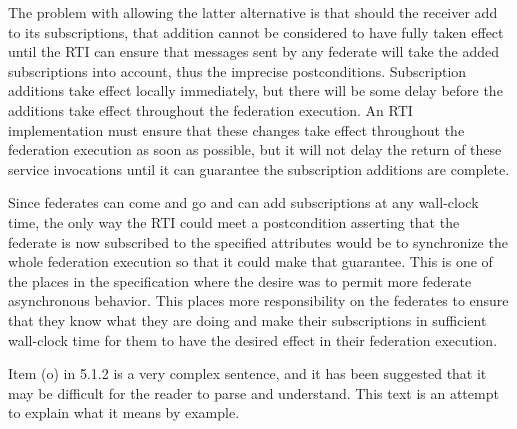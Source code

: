 \begin{annexstdpage}
    The problem with allowing the latter alternative is that should the receiver add to its subscriptions, that addition cannot be considered to have fully taken effect until the RTI can ensure that messages sent by any federate will take the added subscriptions into account, thus the imprecise postconditions. Subscription additions take effect locally immediately, but there will be some delay before the additions take effect throughout the federation execution. An RTI implementation must ensure that these changes take effect throughout the federation execution as soon as possible, but it will not delay the return of these service invocations until it can guarantee the subscription additions are complete.

    Since federates can come and go and can add subscriptions at any wall-clock time, the only way the RTI could meet a postcondition asserting that the federate is now subscribed to the specified attributes would be to synchronize the whole federation execution so that it could make that guarantee. This is one of the places in the specification where the desire was to permit more federate asynchronous behavior. This places more responsibility on the federates to ensure that they know what they are doing and make their subscriptions in sufficient wall-clock time for them to have the desired effect in their federation execution.


    Item (o) in 5.1.2 is a very complex sentence, and it has been suggested that it may be difficult for the reader to parse and understand. This text is an attempt to explain what it means by example.
\end{annexstdpage}

\clearpage

